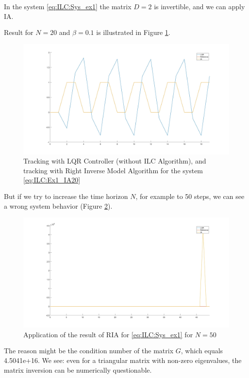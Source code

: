\begin{exam}
	\label{ex:ILC:badIA}
	In the system \eqref{eq:ILC:Sys_ex1} the matrix $D = 2$ is invertible, and we can apply IA.
	
	Result for $N = 20$ and $\beta = 0.1$ is illustrated in Figure  \ref{img:ILC:Ex1_IA20}.
			
	\begin{figure}[ht]
		\label{img:ILC:Ex1_IA20}
		\includegraphics[width=\textwidth]{fig/Ex1_IA20.jpg}
		\caption{Tracking with LQR Controller (without ILC Algorithm), and tracking with Right Inverse Model Algorithm for the system \eqref{eq:ILC:Ex1_IA20}}
	\end{figure}
	
	But if we try to increase the time horizon $N$, for example to 50 steps, we can see a wrong system behavior (Figure \ref{img:ILC:Ex1_IA50}). 
		
			\begin{figure}[ht!]
			\centering
			\includegraphics[width=\textwidth]{fig/Ex1_IA50.jpg}
			\caption{Application of the result of RIA for \ref{eq:ILC:Sys_ex1} for $N = 50$}
			\label{img:ILC:Ex1_IA50}
		\end{figure}
	
	The reason might be the condition number of the matrix $G$, which equals 4.5041e+16. We see: even for a triangular matrix with non-zero eigenvalues, the matrix inversion can be numerically questionable.
		
		
\end{exam}

